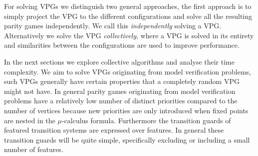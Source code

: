 For solving VPGs we distinguish two general approaches, the first approach is to simply project the VPG to the different configurations and solve all the resulting parity games independently. We call this \textit{independently} solving a VPG. Alternatively we solve the VPG \textit{collectively}, where a VPG is solved in its entirety and similarities between the configurations are used to improve performance. 

In the next sections we explore collective algorithms and analyse their time complexity. We aim to solve VPGs originating from model verification problems, such VPGs generally have certain properties that a completely random VPG might not have. In general parity games originating from model verification problems have a relatively low number of distinct priorities compared to the number of vertices because new priorities are only introduced when fixed points are nested in the $\mu$-calculus formula. Furthermore the transition guards of featured transition systems are expressed over features. In general these transition guards will be quite simple, specifically excluding or including a small number of features.
